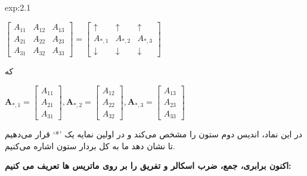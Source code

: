 {\begin{spacing}{1.5}
\begin{example}{exp:2.1}
            \begin{center}
                $\begin{bmatrix}
                     A_{11} & A_{12} & A_{13} \\
                     A_{21} & A_{22} & A_{23} \\
                     A_{31} & A_{32} & A_{33}
                \end{bmatrix}=\begin{bmatrix}
                                  \uparrow   & \uparrow   & \uparrow   \\
                                  A_{*,1}    & A_{*,2}    & A_{*,3}    \\
                                  \downarrow & \downarrow & \downarrow
                \end{bmatrix}$
            \end{center}

            که

            \begin{center}
                $\textbf{A}_{*,1}=\begin{bmatrix}
                                      A_{11} \\
                                      A_{21} \\
                                      A_{31}
                \end{bmatrix},
                \textbf{A}_{*,2}=\begin{bmatrix}
                                     A_{12} \\
                                     A_{22} \\
                                     A_{32}
                \end{bmatrix},
                \textbf{A}_{*,3}=\begin{bmatrix}
                                     A_{13} \\
                                     A_{23} \\
                                     A_{33}
                \end{bmatrix}$
            \end{center}

            در این نماد، اندیس دوم ستون را مشخص می‌کند و در اولین نمایه یک ’*‘ قرار می‌دهیم تا نشان دهد ما به کل بردار ستون اشاره می‌کنیم.

            \textbf{اکنون برابری، جمع، ضرب اسکالر و تفریق را بر روی ماتریس ها تعریف می کنیم:}


\end{example}
\end{spacing}}
